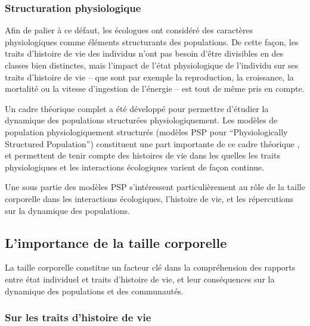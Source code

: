 \subsubsection{Structuration physiologique}

Afin de palier à ce défaut, les écologues ont considéré des caractères
physiologiques comme éléments structurants des populations. De cette façon, les
traits d'histoire de vie des individus n'ont pas besoin d'être divisibles en des
classes bien distinctes, mais l'impact de l'état
physiologique de l'individu sur ses traits d'histoire de vie -- que sont par
exemple la reproduction, la croissance, la mortalité ou la vitesse d'ingestion
de l'énergie -- est tout de même pris en compte. 

Un cadre théorique complet a été développé pour permettre d'étudier la dynamique
des populations structurées physiologiquement. Les modèles de
population physiologiquement structurés (modèles PSP pour ``Physiologically
Structured Population'') constituent une part importante de ce cadre théorique
\autocites{metz1986a,de-roos1992a,de-roos1997a}, et permettent de tenir compte
des histoires de vie dans les quelles les traits physiologiques et les
interactions écologiques varient de façon continue. 

Une sous partie des modèles PSP s'intéressent particulièrement au rôle de la
taille corporelle dans les interactions écologiques, l'histoire de vie, et les
répercutions sur la dynamique des populations. 

\subsection{L'importance de la taille corporelle}

La taille corporelle constitue un facteur clé dans la compréhension des rapports
entre état individuel et traits d'histoire de vie, et leur conséquences sur la
dynamique des populations et des communautés. 

\subsubsection{Sur les traits d'histoire de vie}

